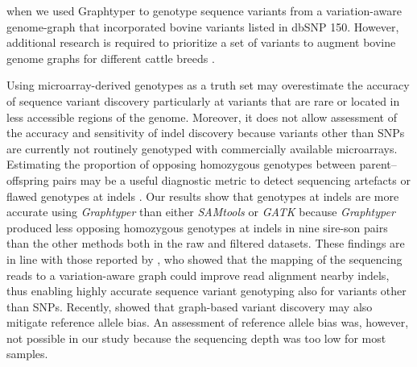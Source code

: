 \documentclass[../main.tex]{subfiles}
\begin{document}
when we used Graphtyper to genotype sequence variants from a variation-aware genome-graph that incorporated bovine variants listed in dbSNP 150. However, additional research is required to prioritize a set of variants to augment bovine genome graphs for different cattle breeds \citep{pritt2018forge}.

Using microarray-derived genotypes as a truth set may overestimate the accuracy of sequence variant discovery particularly at variants that are rare or located in less accessible regions of the genome. Moreover, it does not allow assessment of the accuracy and sensitivity of indel discovery because variants other than SNPs are currently not routinely genotyped with commercially available microarrays. Estimating the proportion of opposing homozygous genotypes between parent–offspring pairs may be a useful diagnostic metric to detect sequencing artefacts or flawed genotypes at indels \citep{patel2014struggle}. Our results show that genotypes at indels are more accurate using \emph{Graphtyper} than either \emph{SAMtools} or \emph{GATK} because \emph{Graphtyper} produced less opposing homozygous genotypes at indels in nine sire-son pairs than the other methods both in the raw and filtered datasets. These findings are in line with those reported by \citep{eggertsson2017graphtyper}, who showed that the mapping of the sequencing reads to a variation-aware graph could improve read alignment nearby indels, thus enabling highly accurate sequence variant genotyping also for variants other than SNPs. Recently, \citep{garrison2018variation} showed that graph-based variant discovery may also mitigate reference allele bias. An assessment of reference allele bias was, however, not possible in our study because the sequencing depth was too low for most samples.
\end{document}
